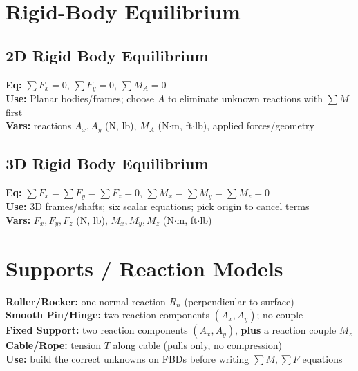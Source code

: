 \documentclass[10pt]{article}
\begin{document}
\section{Rigid-Body Equilibrium}
\begin{multicols}{2}
    \subsection{2D Rigid Body Equilibrium}
    \textbf{Eq:} $\sum F_x=0$, \; $\sum F_y=0$, \; $\sum M_A=0$\\
    \textbf{Use:} Planar bodies/frames; choose $A$ to eliminate unknown reactions with $\sum M$ first\\
    \textbf{Vars:} reactions $A_x,A_y$ (N, lb), $M_A$ (N$\cdot$m, ft$\cdot$lb), applied forces/geometry\\[2pt]

    \subsection{3D Rigid Body Equilibrium}
    \textbf{Eq:} $\sum F_x=\sum F_y=\sum F_z=0$, \; $\sum M_x=\sum M_y=\sum M_z=0$\\
    \textbf{Use:} 3D frames/shafts; six scalar equations; pick origin to cancel terms\\
    \textbf{Vars:} $F_x,F_y,F_z$ (N, lb), $M_x,M_y,M_z$ (N$\cdot$m, ft$\cdot$lb)\\
\end{multicols}

\section{Supports / Reaction Models}
\textbf{Roller/Rocker:} one normal reaction $R_n$ (perpendicular to surface)\\
\textbf{Smooth Pin/Hinge:} two reaction components $\left( A_x , A_y \right)$; no couple\\
\textbf{Fixed Support:} two reaction components $\left( A_x , A_y \right)$, \textbf{plus} a reaction couple $M_z$\\
\textbf{Cable/Rope:} tension $T$ along cable (pulls only, no compression)\\
\textbf{Use:} build the correct unknowns on FBDs before writing $\sum M , \sum F$ equations
\end{document}
